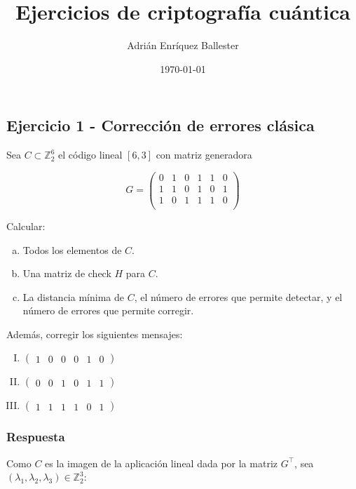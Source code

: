 \documentclass{article}
\title{Ejercicios de criptografía cuántica}
\author{Adrián Enríquez Ballester}
\date{\today}
\begin{document}
\maketitle

\subsection*{Ejercicio 1 - Corrección de errores clásica}

Sea $C \subset \mathbb{Z}_2^6$ el código lineal $[6, 3]$ con
matriz generadora 

$$
G = \begin{pmatrix}
  0 & 1 & 0 & 1 & 1 & 0 \\ 
  1 & 1 & 0 & 1 & 0 & 1 \\
  1 & 0 & 1 & 1 & 1 & 0 \\
\end{pmatrix}
$$

Calcular:

\begin{enumerate}[a)]
  \item Todos los elementos de $C$.
  \item Una matriz de check $H$ para $C$.
  \item La distancia mínima de $C$, el número de errores que permite
    detectar, y el número de errores que permite corregir.
\end{enumerate}

Además, corregir los siguientes mensajes:

\begin{enumerate}[I)]
  \item $\begin{pmatrix} 1 & 0 & 0 & 0 & 1 & 0 \end{pmatrix}$
  \item $\begin{pmatrix} 0 & 0 & 1 & 0 & 1 & 1 \end{pmatrix}$
  \item $\begin{pmatrix} 1 & 1 & 1 & 1 & 0 & 1 \end{pmatrix}$
\end{enumerate}

\subsubsection*{Respuesta}

Como $C$ es la imagen de la aplicación lineal dada por la matriz
$G^\top$, sea $(\lambda_1, \lambda_2, \lambda_3) \in
\mathbb{Z}_2^3$:
\end{document}
